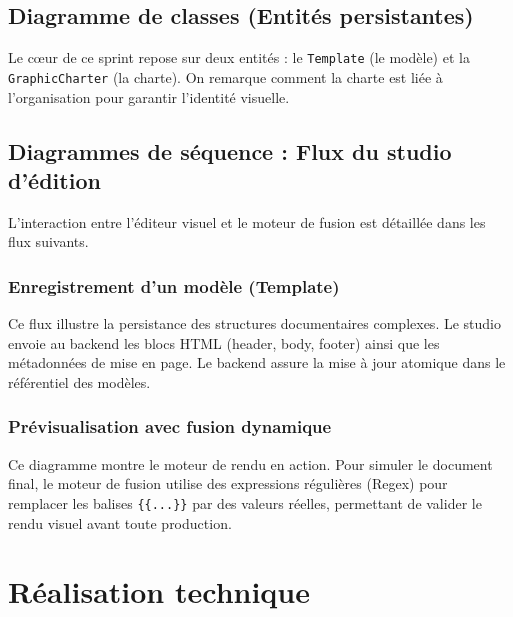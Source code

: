 \subsection{Diagramme de classes (Entités persistantes)}

Le cœur de ce sprint repose sur deux entités : le \texttt{Template} (le modèle) et la \texttt{GraphicCharter} (la charte). On remarque comment la charte est liée à l'organisation pour garantir l'identité visuelle.


\subsection{Diagrammes de séquence : Flux du studio d'édition}

L'interaction entre l'éditeur visuel et le moteur de fusion est détaillée dans les flux suivants.

\subsubsection{Enregistrement d'un modèle (Template)}

Ce flux illustre la persistance des structures documentaires complexes. Le studio envoie au backend les blocs HTML (header, body, footer) ainsi que les métadonnées de mise en page. Le backend assure la mise à jour atomique dans le référentiel des modèles.


\subsubsection{Prévisualisation avec fusion dynamique}

Ce diagramme montre le moteur de rendu en action. Pour simuler le document final, le moteur de fusion utilise des expressions régulières (Regex) pour remplacer les balises \texttt{\{\{...\}\}} par des valeurs réelles, permettant de valider le rendu visuel avant toute production.


\section{Réalisation technique}


